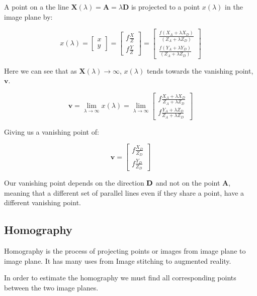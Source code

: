 \documentclass{article}
\begin{document}
A point on a the line $\mathbf{X}(\lambda) = \mathbf{A} = \lambda \mathbf{D}   $ is projected to a point $x(\lambda)$ in the image plane by:

\[
  x(\lambda) = \begin{bmatrix}
    x\\y
  \end{bmatrix} = \begin{bmatrix}
    f \frac{X}{Z}\\ f \frac{Y}{Z}
  \end{bmatrix}=
  \begin{bmatrix}
    \frac{f(X_{A} + \lambda X_{D})}{(Z_{A}+ \lambda Z_{D})}\\
    \frac{f(Y_{A}+\lambda Y_{D})}{(Z_{A}+ \lambda Z_{D})}
  \end{bmatrix}
\]

Here we can see that as $\mathbf{X}(\lambda) \rightarrow \infty $, $x(\lambda)$ tends towards the vanishing point, $\mathbf{v} $.


\[
  \mathbf{v} = \lim_{\lambda \to \infty}x(\lambda) = \lim_{\lambda \to \infty} \begin{bmatrix}
    f \frac{X_{A}+ \lambda X_{D}}{Z_{A}+ \lambda Z_{D}} \\
    f \frac{Y_{A}+ \lambda Z_{D}}{Z_{A} + \lambda Z_{D}}
  \end{bmatrix}
\]

Giving us a vanishing point of:

\[
  \mathbf{v} = \begin{bmatrix}
    f \frac{X_{D}}{Z_{D}} \\
    f \frac{Y_{D}}{Z_{D}}
  \end{bmatrix}
\]

Our vanishing point depends on the direction $\bf D$ and not on the point $\mathbf{A} $, meaning that a different set of parallel lines even if they share a point, have a different vanishing point.

\subsection{Homography}
\label{subsec:homography}

Homography is the process of projecting points or images from image plane to image plane. It has many uses from Image stitching to augmented reality.

In order to estimate the homography we must find all corresponding points between the two image planes.
\end{document}
